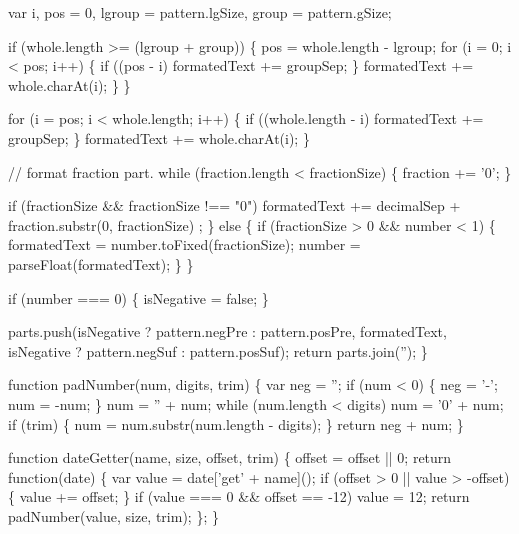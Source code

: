 \begin{DoxyCodeInclude}
{{{{    var i, pos = 0,
        lgroup = pattern.lgSize,
        group = pattern.gSize;

    \textcolor{keywordflow}{if} (whole.length >= (lgroup + group)) \{
      pos = whole.length - lgroup;
      \textcolor{keywordflow}{for} (i = 0; i < pos; i++) \{
        \textcolor{keywordflow}{if} ((pos - i) %
          formatedText += groupSep;
        \}
        formatedText += whole.charAt(i);
      \}
    \}

    \textcolor{keywordflow}{for} (i = pos; i < whole.length; i++) \{
      \textcolor{keywordflow}{if} ((whole.length - i) %
        formatedText += groupSep;
      \}
      formatedText += whole.charAt(i);
    \}

    \textcolor{comment}{// format fraction part.}
    \textcolor{keywordflow}{while} (fraction.length < fractionSize) \{
      fraction += \textcolor{charliteral}{'0'};
    \}

    \textcolor{keywordflow}{if} (fractionSize && fractionSize !== \textcolor{stringliteral}{"0"}) formatedText += decimalSep + fraction.substr(0, fractionSize)
      ;
  \} \textcolor{keywordflow}{else} \{
    \textcolor{keywordflow}{if} (fractionSize > 0 && number < 1) \{
      formatedText = number.toFixed(fractionSize);
      number = parseFloat(formatedText);
    \}
  \}

  \textcolor{keywordflow}{if} (number === 0) \{
    isNegative = \textcolor{keyword}{false};
  \}

  parts.push(isNegative ? pattern.negPre : pattern.posPre,
             formatedText,
             isNegative ? pattern.negSuf : pattern.posSuf);
  \textcolor{keywordflow}{return} parts.join(\textcolor{stringliteral}{''});
\}

\textcolor{keyword}{function} padNumber(num, digits, trim) \{
  var neg = \textcolor{stringliteral}{''};
  \textcolor{keywordflow}{if} (num < 0) \{
    neg =  \textcolor{charliteral}{'-'};
    num = -num;
  \}
  num = \textcolor{stringliteral}{''} + num;
  \textcolor{keywordflow}{while} (num.length < digits) num = \textcolor{charliteral}{'0'} + num;
  \textcolor{keywordflow}{if} (trim) \{
    num = num.substr(num.length - digits);
  \}
  \textcolor{keywordflow}{return} neg + num;
\}


\textcolor{keyword}{function} dateGetter(name, size, offset, trim) \{
  offset = offset || 0;
  \textcolor{keywordflow}{return} \textcolor{keyword}{function}(date) \{
    var value = date[\textcolor{stringliteral}{'get'} + name]();
    \textcolor{keywordflow}{if} (offset > 0 || value > -offset) \{
      value += offset;
    \}
    \textcolor{keywordflow}{if} (value === 0 && offset == -12) value = 12;
    \textcolor{keywordflow}{return} padNumber(value, size, trim);
  \};
\}

}}}}
\end{DoxyCodeInclude}
